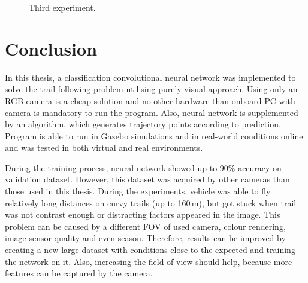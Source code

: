 \begin{figure}[!h]

  \centering

  \centering	
  


  \caption{Third experiment.}
  \label{fig:third_trail_photos}
\end{figure}


\chapter{Conclusion}


In this thesis, a classification convolutional neural network was implemented to solve the trail following problem utilising purely visual approach. Using only an RGB camera is a cheap solution and no other hardware than onboard PC with camera is mandatory to run the program. Also, neural network is supplemented by an algorithm, which generates trajectory points according to prediction. Program is able to run in Gazebo simulations and in real-world conditions online and was tested in both virtual and real environments. 

During the training process, neural network showed up to 90\% accuracy on validation dataset. However, this dataset was acquired by other cameras than those used in this thesis. During the experiments, vehicle was able to fly relatively long distances on curvy trails (up to 160\,m), but got stuck when trail was not contrast enough or distracting factors appeared in the image. This problem can be caused by a different \acs{FOV} of used camera, colour rendering, image sensor quality and even season. Therefore, results can be improved by creating a new large dataset with conditions close to the expected and training the network on it. Also, increasing the field of view should help, because more features can be captured by the camera.

